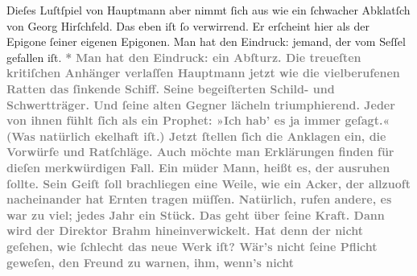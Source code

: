 \begin{ledgroupsized}[t]{13cm}
{{                  Dieſes Luſtſpiel von Hauptmann aber nimmt ſich aus wie ein
                  ſchwacher Abklatſch von Georg Hirſchfeld.
                  Das eben iſt ſo verwirrend. Er erſcheint hier als der Epigone ſeiner eigenen
                  Epigonen. Man hat den Eindruck: jemand, der vom Seſſel gefallen iſt.}}\pend
           \pstart
           \centering{}\textcolor{gray}{\textbf{*}}\pend
           \pstart
           \noindent{}\textcolor{gray}{\textbf{Man hat den Eindruck: ein Abſturz. Die treueſten kritiſchen
                  Anhänger verlaſſen Hauptmann jetzt wie die
                  vielberufenen Ratten das ſinkende Schiff. Seine begeiſterten Schild- und
                  Schwertträger. Und ſeine alten Gegner lächeln triumphierend. Jeder von ihnen fühlt
                  ſich als ein Prophet: »Ich hab’ es ja immer geſagt.« (Was natürlich ekelhaft iſt.)
                  Jetzt ſtellen ſich die Anklagen ein, die Vorwürfe und Ratſchläge. Auch möchte man
                  Erklärungen finden für dieſen merkwürdigen Fall. Ein müder Mann, heißt es, der
                  ausruhen ſollte. Sein Geiſt ſoll brachliegen eine Weile, wie ein Acker, der
                  allzuoft nacheinander hat Ernten tragen müſſen. Natürlich, rufen andere, es war zu
                  viel; jedes Jahr ein Stück. Das geht über ſeine Kraft. Dann wird der Direktor Brahm hineinverwickelt. Hat denn der nicht
                  geſehen, wie ſchlecht das neue Werk iſt? Wär’s nicht ſeine Pflicht geweſen, den Freund zu warnen, ihm, wenn’s nicht
}}
\end{ledgroupsized}
